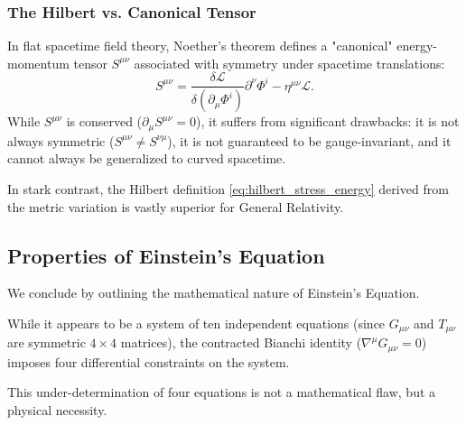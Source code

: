 \documentclass[11pt, a4paper]{report}
\begin{document}
\subsubsection*{The Hilbert vs. Canonical Tensor}
In flat spacetime field theory, Noether's theorem defines a "canonical" energy-momentum tensor $S^{\mu\nu}$ associated with symmetry under spacetime translations: %
\begin{equation}
S^{\mu\nu} = \frac{\delta \mathcal{L}}{\delta(\partial_{\mu}\Phi^{i})} \partial^{\nu}\Phi^{i} - \eta^{\mu\nu}\mathcal{L}. %
\end{equation}
While $S^{\mu\nu}$ is conserved ($\partial_{\mu}S^{\mu\nu}=0$), it suffers from significant drawbacks: it is not always symmetric ($S^{\mu\nu} \neq S^{\nu\mu}$), it is not guaranteed to be gauge-invariant, and it cannot always be generalized to curved spacetime. %

In stark contrast, the Hilbert definition \eqref{eq:hilbert_stress_energy} derived from the metric variation is vastly superior for General Relativity. %

\subsection{Properties of Einstein's Equation}

We conclude by outlining the mathematical nature of Einstein's Equation. %

While it appears to be a system of ten independent equations (since $G_{\mu\nu}$ and $T_{\mu\nu}$ are symmetric $4 \times 4$ matrices), the contracted Bianchi identity ($\nabla^{\mu}G_{\mu\nu} = 0$) imposes four differential constraints on the system. %

This under-determination of four equations is not a mathematical flaw, but a physical necessity. %
\end{document}
